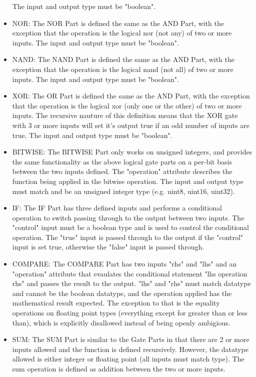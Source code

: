 \begin{itemize}[label={}]
The input and output type must be "boolean".
    \item NOR:
The NOR Part is defined the same as the AND Part, with the exception that the operation is the logical nor (not any) of two or more inputs.
The input and output type must be "boolean".
    \item NAND:
The NAND Part is defined the same as the AND Part, with the exception that the operation is the logical nand (not all) of two or more inputs.
The input and output type must be "boolean".
    \item XOR:
The OR Part is defined the same as the AND Part, with the exception that the operation is the logical xor (only one or the other) of two or more inputs.
The recursive nauture of this definition means that the XOR gate with 3 or more inputs will set it's output true if an odd number of inputs are true.
The input and output type must be "boolean".
    \item BITWISE:
The BITWISE Part only works on unsigned integers, and provides the same functionality as the above logical gate parts on a per-bit basis between the two inputs defined.
The "operation" attribute describes the function being applied in the bitwise operation.
The input and output type must match and be an unsigned integer type (e.g. uint8, uint16, uint32).
    \item IF:
The IF Part has three defined inputs and performs a conditional operation to switch passing through to the output between two inputs.
The "control" input must be a boolean type and is used to control the conditional operation.
The "true" input is passed through to the output if the "control" input is set true, otherwise the "false" input is passed through.
    \item COMPARE:
The COMPARE Part has two inputs "rhs" and "lhs" and an "operation" attribute that evaulates the conditional statement "lhs operation rhs" and passes the result to the output.
"lhs" and "rhs" must match datatype and cannot be the boolean datatype, and the operation applied has the mathematical result expected.
The exception to that is the equality operations on floating point types (everything except for greater than or less than), which is explicitly disallowed instead of being openly ambigious.
    \item SUM:
The SUM Part is similar to the Gate Parts in that there are 2 or more inputs allowed and the function is defined recursively.
However, the datatype allowed is either integer or floating point (all inputs must match type).
The sum operation is defined as addition between the two or more inputs.

\end{itemize}
